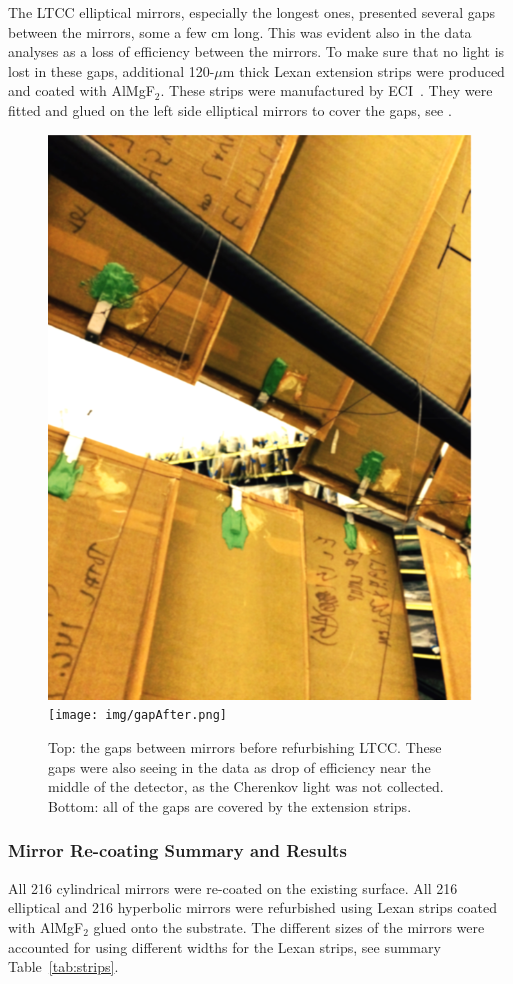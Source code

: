 The LTCC elliptical mirrors, especially the longest ones, presented several gaps between the mirrors, some a few cm long.
This was evident also in the data analyses as a loss of efficiency between the mirrors.
To make sure that no light is lost in these gaps, additional 120-$\mu$m thick Lexan extension strips were produced
and coated with AlMgF$_2$.
These strips were manufactured by ECI~\cite{ECI}. They were fitted and glued on the left side elliptical mirrors to
cover the gaps, see .

\begin{figure}
\centering
	\includegraphics[width=0.98\columnwidth, height=0.7\columnwidth]{img/gapBefore.png}
	\texttt{[image: img/gapAfter.png]}
	\caption{Top: the gaps between mirrors before refurbishing LTCC. These gaps were also seeing in the data as
			 drop of efficiency near the middle of the detector, as the Cherenkov light was not collected.
             Bottom: all of the gaps are covered by the extension strips.}
	\label{fig:gapBeforeAndAfter}
\end{figure}

\subsubsection{Mirror Re-coating Summary and Results}

All 216 cylindrical mirrors were re-coated on the existing surface. All 216 elliptical and 216 hyperbolic mirrors were
refurbished using Lexan strips coated with AlMgF$_2$ glued onto the substrate. The different sizes of the mirrors
were accounted for using different widths for the Lexan strips, see summary Table~\ref{tab:strips}.

